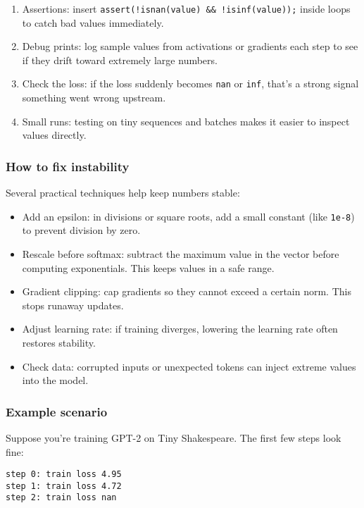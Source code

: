 \documentclass[
  letterpaper,
  DIV=11,
  numbers=noendperiod]{scrreprt}
\providecommand{\tightlist}{%
  \setlength{\itemsep}{0pt}\setlength{\parskip}{0pt}}
\begin{document}
\begin{enumerate}
\def\labelenumi{\arabic{enumi}.}
\tightlist
\item
  Assertions: insert
  \texttt{assert(!isnan(value)\ \&\&\ !isinf(value));} inside loops to
  catch bad values immediately.
\item
  Debug prints: log sample values from activations or gradients each
  step to see if they drift toward extremely large numbers.
\item
  Check the loss: if the loss suddenly becomes \texttt{nan} or
  \texttt{inf}, that's a strong signal something went wrong upstream.
\item
  Small runs: testing on tiny sequences and batches makes it easier to
  inspect values directly.
\end{enumerate}

\subsubsection{How to fix instability}\label{how-to-fix-instability}

Several practical techniques help keep numbers stable:

\begin{itemize}
\tightlist
\item
  Add an epsilon: in divisions or square roots, add a small constant
  (like \texttt{1e-8}) to prevent division by zero.
\item
  Rescale before softmax: subtract the maximum value in the vector
  before computing exponentials. This keeps values in a safe range.
\item
  Gradient clipping: cap gradients so they cannot exceed a certain norm.
  This stops runaway updates.
\item
  Adjust learning rate: if training diverges, lowering the learning rate
  often restores stability.
\item
  Check data: corrupted inputs or unexpected tokens can inject extreme
  values into the model.
\end{itemize}

\subsubsection{Example scenario}\label{example-scenario-2}

Suppose you're training GPT-2 on Tiny Shakespeare. The first few steps
look fine:

\begin{verbatim}
step 0: train loss 4.95
step 1: train loss 4.72
step 2: train loss nan
\end{verbatim}
\end{document}
